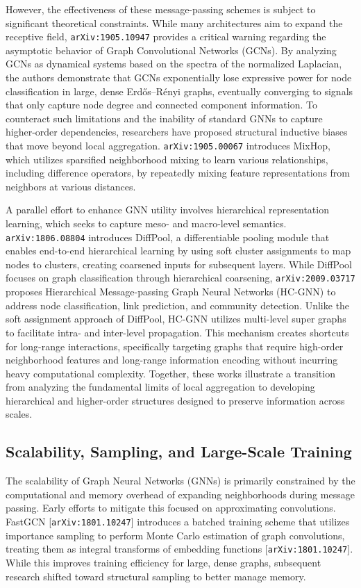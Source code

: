 \documentclass[11pt]{article}
\begin{document}
However, the effectiveness of these message-passing schemes is subject to significant theoretical constraints. While many architectures aim to expand the receptive field, \texttt{arXiv:1905.10947} provides a critical warning regarding the asymptotic behavior of Graph Convolutional Networks (GCNs). By analyzing GCNs as dynamical systems based on the spectra of the normalized Laplacian, the authors demonstrate that GCNs exponentially lose expressive power for node classification in large, dense Erdős–Rényi graphs, eventually converging to signals that only capture node degree and connected component information. To counteract such limitations and the inability of standard GNNs to capture higher-order dependencies, researchers have proposed structural inductive biases that move beyond local aggregation. \texttt{arXiv:1905.00067} introduces MixHop, which utilizes sparsified neighborhood mixing to learn various relationships, including difference operators, by repeatedly mixing feature representations from neighbors at various distances.

A parallel effort to enhance GNN utility involves hierarchical representation learning, which seeks to capture meso- and macro-level semantics. \texttt{arXiv:1806.08804} introduces DiffPool, a differentiable pooling module that enables end-to-end hierarchical learning by using soft cluster assignments to map nodes to clusters, creating coarsened inputs for subsequent layers. While DiffPool focuses on graph classification through hierarchical coarsening, \texttt{arXiv:2009.03717} proposes Hierarchical Message-passing Graph Neural Networks (HC-GNN) to address node classification, link prediction, and community detection. Unlike the soft assignment approach of DiffPool, HC-GNN utilizes multi-level super graphs to facilitate intra- and inter-level propagation. This mechanism creates shortcuts for long-range interactions, specifically targeting graphs that require high-order neighborhood features and long-range information encoding without incurring heavy computational complexity. Together, these works illustrate a transition from analyzing the fundamental limits of local aggregation to developing hierarchical and higher-order structures designed to preserve information across scales.

\subsection{Scalability, Sampling, and Large-Scale Training}

The scalability of Graph Neural Networks (GNNs) is primarily constrained by the computational and memory overhead of expanding neighborhoods during message passing. Early efforts to mitigate this focused on approximating convolutions. FastGCN [\texttt{arXiv:1801.10247}] introduces a batched training scheme that utilizes importance sampling to perform Monte Carlo estimation of graph convolutions, treating them as integral transforms of embedding functions [\texttt{arXiv:1801.10247}]. While this improves training efficiency for large, dense graphs, subsequent research shifted toward structural sampling to better manage memory.
\end{document}
